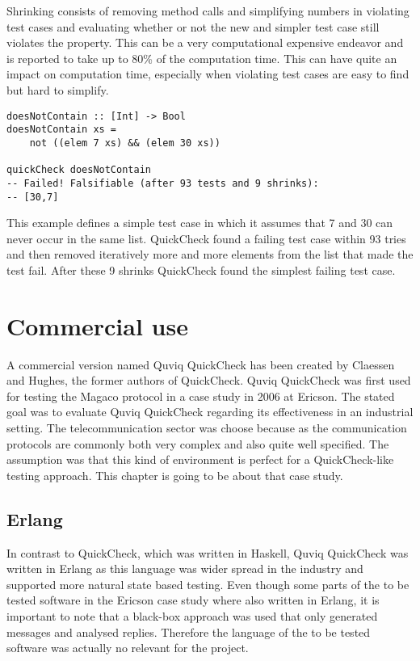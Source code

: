 \documentclass[a4paper, 12pt]{article} %
\begin{document}
Shrinking consists of removing method calls and simplifying numbers in violating test cases and evaluating whether or not the new and simpler test case still violates the property. This can be a very computational expensive endeavor and is reported to take up to 80\% of the computation time. This can have quite an impact on computation time, especially when violating test cases are easy to find but hard to simplify. \cite{Hughes:2016}

\begin{verbatim}
doesNotContain :: [Int] -> Bool
doesNotContain xs = 
    not ((elem 7 xs) && (elem 30 xs))

quickCheck doesNotContain
-- Failed! Falsifiable (after 93 tests and 9 shrinks):
-- [30,7]
\end{verbatim}

This example defines a simple test case in which it assumes that 7 and 30 can never occur in the same list. QuickCheck found a failing test case within 93 tries and then removed iteratively more and more elements from the list that made the test fail. After these 9 shrinks QuickCheck found the simplest failing test case.

\section{Commercial use}

A commercial version named Quviq QuickCheck has been created by Claessen and Hughes, the former authors of QuickCheck. Quviq QuickCheck was first used for testing the Magaco protocol in a case study in 2006 at Ericson. The stated goal was to evaluate Quviq QuickCheck regarding its effectiveness in an industrial setting. The telecommunication sector was choose because as the communication protocols are commonly both very complex and also quite well specified. The assumption was that this kind of environment is perfect for a QuickCheck-like testing approach. This chapter is going to be about that case study. \cite{Arts06}

\subsection{Erlang}

In contrast to QuickCheck, which was written in Haskell, Quviq QuickCheck was written in Erlang as this language was wider spread in the industry and supported more natural state based testing. Even though some parts of the to be tested software in the Ericson case study where also written in Erlang, it is important to note that a black-box approach was used that only generated messages and analysed replies. Therefore the language of the to be tested software was actually no relevant for the project. \cite{Arts06} 
\end{document}
